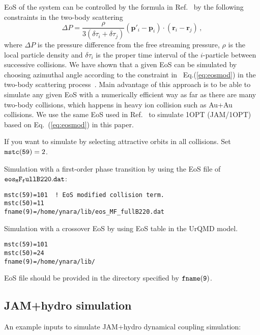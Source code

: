 \documentclass[]{article}
\newcommand{\ttt}[1]{{\tt#1}}
\begin{document}
EoS of the system can be controlled by the formula
in Ref.~\cite{HSorgePRL1999} by the following constraints
in the two-body scattering
\begin{equation}
\Delta P = \frac{\rho}{3(\delta\tau_i + \delta\tau_j)}
 (\bm{p}'_i-\bm{p}_i)\cdot (\bm{r}_i-\bm{r}_j) \,,
  \label{eq:eosmod}
\end{equation}
where $\Delta P$ is the pressure difference from the free streaming pressure,
$\rho$ is the local particle density and $\delta\tau_i$
is the proper time interval of the $i$-particle
between successive collisions.
We have shown that a given EoS can be simulated
by choosing azimuthal angle according to
the constraint in ~Eq.(\ref{eq:eosmod})
in the two-body scattering process~\cite{Nara:2016hbg}.
Main advantage of this approach is to be able to simulate any given EoS
with a numerically efficient way as far as there are many two-body collisions,
which happens in heavy ion collision such as Au+Au collisions.
We use the same EoS used in Ref.~\cite{Nara:2016hbg} to simulate
1OPT (JAM/1OPT) based on Eq.~(\ref{eq:eosmod}) in this paper.




If you want to simulate by selecting attractive orbits in all
collisions. Set $\ttt{mstc(59)}=2$.

\bigskip
Simulation with a first-order phase transition by using the EoS file
of $\ttt{eos_MF_fullB220.dat}$:

\begin{verbatim}
mstc(59)=101  ! EoS modified collision term.
mstc(50)=11
fname(9)=/home/ynara/lib/eos_MF_fullB220.dat
\end{verbatim}

\bigskip
Simulation with a crossover EoS by using EoS table in the UrQMD  model.
\begin{verbatim}
mstc(59)=101
mstc(50)=24
fname(9)=/home/ynara/lib/
\end{verbatim}
EoS file should be provided in the directory specified by $\ttt{fname(9)}$.





\subsection{JAM+hydro simulation} \label{sec:jamhydro}

An example inputs to simulate JAM+hydro dynamical coupling simulation:
\end{document}

